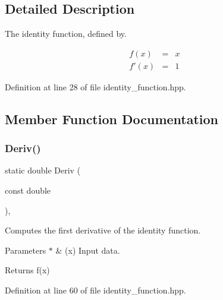 \subsection{Detailed Description}
The identity function, defined by. 

\begin{eqnarray*} f(x) &=& x \\ f'(x) &=& 1 \end{eqnarray*} 

Definition at line 28 of file identity\+\_\+function.\+hpp.



\subsection{Member Function Documentation}
\mbox{\label{classmlpack_1_1ann_1_1IdentityFunction_a6e87bef3ba5736353235159d3527b853}} 
\subsubsection{Deriv()\hspace{0.1cm}{\footnotesize\ttfamily [1/3]}}
{\footnotesize\ttfamily static double Deriv (\begin{DoxyParamCaption}\item[{const double}]{ }\end{DoxyParamCaption})\hspace{0.3cm}{\ttfamily [inline]}, {\ttfamily [static]}}



Computes the first derivative of the identity function. 


\begin{DoxyParams}{Parameters}
{\em $\ast$} & (x) Input data. \\
\hline
\end{DoxyParams}
\begin{DoxyReturn}{Returns}
f\textquotesingle{}(x) 
\end{DoxyReturn}


Definition at line 60 of file identity\+\_\+function.\+hpp.

\mbox{\label{classmlpack_1_1ann_1_1IdentityFunction_ad442502c34b67303b74c735641dab790}} 
